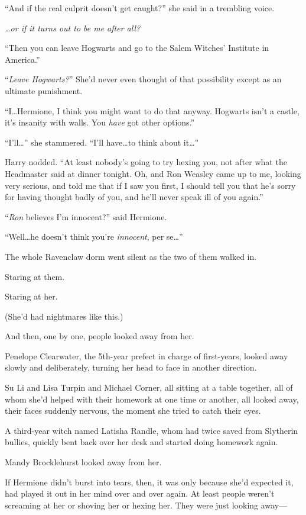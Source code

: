 “And if the real culprit doesn’t get caught?” she said in a trembling voice.

\emph{…or if it turns out to be me after all?}

“Then you can leave Hogwarts and go to the Salem Witches’ Institute in America.”

“\emph{Leave Hogwarts?}” She’d never even thought of that possibility except as an ultimate punishment.

“I…Hermione, I think you might want to do that anyway. Hogwarts isn’t a castle, it’s insanity with walls. You \emph{have} got other options.”

“I’ll…” she stammered. “I’ll have…to think about it…”

Harry nodded. “At least nobody’s going to try hexing you, not after what the Headmaster said at dinner tonight. Oh, and Ron Weasley came up to me, looking very serious, and told me that if I saw you first, I should tell you that he’s sorry for having thought badly of you, and he’ll never speak ill of you again.”

“\emph{Ron} believes I’m innocent?” said Hermione.

“Well…he doesn’t think you’re \emph{innocent}, per se…”

\later

The whole Ravenclaw dorm went silent as the two of them walked in.

Staring at them.

Staring at her.

(She’d had nightmares like this.)

And then, one by one, people looked away from her.

Penelope Clearwater, the 5th-year prefect in charge of first-years, looked away slowly and deliberately, turning her head to face in another direction.

Su Li and Lisa Turpin and Michael Corner, all sitting at a table together, all of whom she’d helped with their homework at one time or another, all looked away, their faces suddenly nervous, the moment she tried to catch their eyes.

A third-year witch named Latisha Randle, whom \SPHEW had twice saved from Slytherin bullies, quickly bent back over her desk and started doing homework again.

Mandy Brocklehurst looked away from her.

If Hermione didn’t burst into tears, then, it was only because she’d expected it, had played it out in her mind over and over again. At least people weren’t screaming at her or shoving her or hexing her. They were just looking away—

